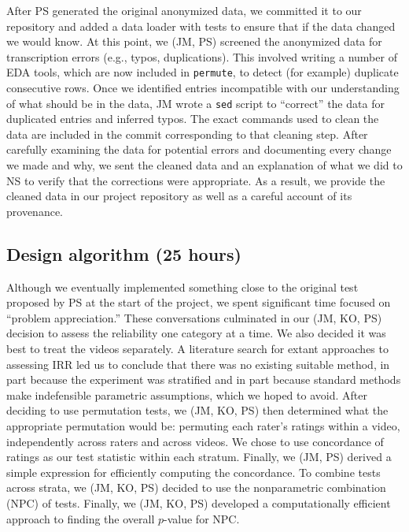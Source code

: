 \documentclass[]{article}
\begin{document}
After PS generated the original anonymized data, we committed it to our
repository and added a data loader with tests to ensure that if the data
changed we would know.
At this point, we (JM, PS) screened the anonymized data for transcription
errors (e.g., typos, duplications).
This involved writing a number of EDA tools, which are now included in
\texttt{permute}, to detect (for example) duplicate consecutive rows.
Once we identified entries incompatible with our understanding of what should
be in the data, JM wrote a \texttt{sed} script to ``correct'' the data for
duplicated entries and inferred typos.
The exact commands used to clean the data are included in the commit
corresponding to that cleaning step.
After carefully examining the data for potential errors and documenting
every change we made and why, we sent the cleaned data and an explanation
of what we did to NS to verify that the corrections were appropriate.
As a result, we provide the cleaned data in our project repository as well
as a careful account of its provenance.

\subsection{Design algorithm (25 hours)}

Although we eventually implemented something close to the original test
proposed by PS at the start of the project, we spent significant time focused
on  ``problem appreciation.''
These conversations culminated in our (JM, KO, PS) decision to assess the
reliability one category at a time.
We also decided it was best to treat the videos separately.
A literature search for extant approaches to assessing IRR led us to conclude
that there was no existing suitable method, in part because the experiment was
stratified and in part because standard methods make indefensible parametric
assumptions, which we hoped to avoid.
After deciding to use permutation tests, we (JM, KO, PS) then determined what
the appropriate permutation would be: permuting each rater's ratings within a
video, independently across raters and across videos.
We chose to use concordance of ratings as our test statistic within each
stratum.
Finally, we (JM, PS) derived a simple expression for efficiently computing the
concordance.
To combine tests across strata, we (JM, KO, PS) decided to use the nonparametric
combination (NPC) of tests.
Finally, we (JM, KO, PS) developed a computationally efficient approach to
finding the overall $p$-value for NPC.
\end{document}
